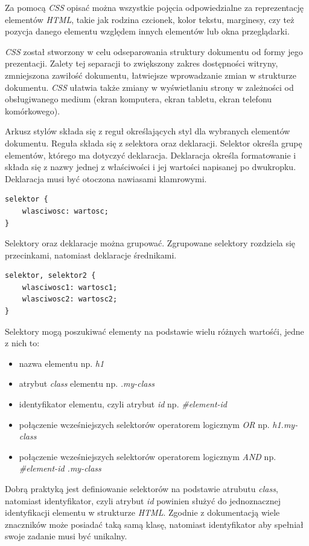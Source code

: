 \documentclass[polish, twoside, 12pt]{mwart}
\begin{document}
Za pomocą \emph{CSS} opisać można wszystkie pojęcia odpowiedzialne za reprezentację elementów \emph{HTML}, takie jak rodzina czcionek, kolor tekstu, marginesy, czy też pozycja danego elementu względem innych elementów lub okna przeglądarki.

\emph{CSS} został stworzony w celu odseparowania struktury dokumentu od formy jego prezentacji. Zalety tej separacji to zwiększony zakres dostępności witryny, zmniejszona zawiłość dokumentu, łatwiejsze wprowadzanie zmian w strukturze dokumentu. \emph{CSS} ułatwia także zmiany w wyświetlaniu strony w zależności od obsługiwanego medium (ekran komputera, ekran tabletu, ekran telefonu komórkowego).

Arkusz stylów składa się z reguł określających styl dla wybranych elementów dokumentu. Reguła składa się z selektora oraz deklaracji. Selektor określa grupę elementów, którego ma dotyczyć deklaracja. Deklaracja określa formatowanie i składa się z nazwy jednej z właściwości i jej wartości napisanej po dwukropku. Deklaracja musi być otoczona nawiasami klamrowymi.

\begin{lstlisting}
selektor { 
	wlasciwosc: wartosc; 
}
\end{lstlisting}

Selektory oraz deklaracje można grupować. Zgrupowane selektory rozdziela się przecinkami, natomiast deklaracje średnikami.

\begin{lstlisting}
selektor, selektor2 { 
	wlasciwosc1: wartosc1;
	wlasciwosc2: wartosc2;
}
\end{lstlisting}

Selektory mogą poszukiwać elementy na podstawie wielu różnych wartośći, jedne z nich to:

\begin{itemize}
  \item nazwa elementu np. \emph{h1}
  \item atrybut \emph{class} elementu np. \emph{.my-class}
  \item identyfikator elementu, czyli atrybut \emph{id} np. \emph{\#element-id}
  \item połączenie wcześniejszych selektorów operatorem logicznym \emph{OR} np. \emph{h1.my-class}
  \item połączenie wcześniejszych selektorów operatorem logicznym \emph{AND} np. \emph{\#element-id .my-class}
\end{itemize}

Dobrą praktyką jest definiowanie selektorów na podstawie atrubutu \emph{class}, natomiast identyfikator, czyli atrybut \emph{id} powinien służyć do jednoznacznej identyfikacji elementu w strukturze \emph{HTML}. Zgodnie z dokumentacją wiele znaczników może posiadać taką samą klasę, natomiast identyfikator aby spełniał swoje zadanie musi być unikalny.
\end{document}
